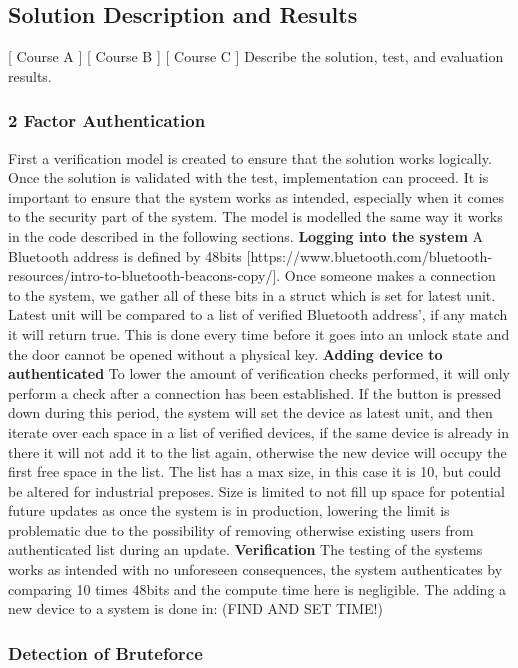 \subsection{Solution Description and Results}
[ Course A ] [ Course B ] [ Course C ] 
\newline
Describe the solution, test, and evaluation results.
\subsubsection{2 Factor Authentication}
First a verification model is created to ensure that the solution works logically. Once the solution is validated with the test, implementation can proceed. It is important to ensure that the system works as intended, especially when it comes to the security part of the system. The model is modelled the same way it works in the code described in the following sections.
\newline
\textbf{Logging into the system}\newline
A Bluetooth address is defined by 48bits [https://www.bluetooth.com/bluetooth-resources/intro-to-bluetooth-beacons-copy/]. Once someone makes a connection to the system, we gather all of these bits in a struct which is set for latest unit. Latest unit will be compared to a list of verified Bluetooth address', if any match it will return true. This is done every time before it goes into an unlock state and the door cannot be opened without a physical key.
\newline
\textbf{Adding device to authenticated}\newline
To lower the amount of verification checks performed, it will only perform a check after a connection has been established. If the button is pressed down during this period, the system will set the device as latest unit, and then iterate over each space in a list of verified devices, if the same device is already in there it will not add it to the list again, otherwise the new device will occupy the first free space in the list. The list has a max size, in this case it is 10, but could be altered for industrial preposes. Size is limited to not fill up space for potential future updates as once the system is in production, lowering the limit is problematic due to the possibility of removing otherwise existing users from authenticated list during an update.
\newline
\textbf{Verification}\newline
The testing of the systems works as intended with no unforeseen consequences, the system authenticates by comparing 10 times 48bits and the compute time here is negligible. The adding a new device to a system is done in: (FIND AND SET TIME!)

\subsubsection{Detection of Bruteforce}